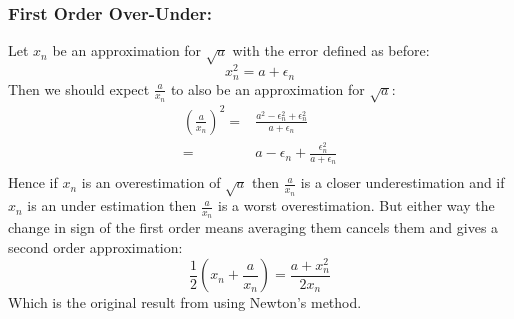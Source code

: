 \subsubsection{First Order Over-Under:}
Let $x_n$ be an approximation for $\sqrt{a}$ with the error defined as before:
\[x_n^2 = a + \epsilon_n\]
Then we should expect $\frac{a}{x_n}$ to also be an approximation for $\sqrt{a}$:
\begin{equation*}
\begin{aligned}
	\left(\frac{a}{x_n}\right)^2 =& \frac{a^2-\epsilon_n^2+\epsilon_n^2}{a+\epsilon_n} \\
	=& a - \epsilon_n + \frac{\epsilon_n^2}{a+\epsilon_n}\\
\end{aligned}
\end{equation*}
Hence if $x_n$ is an overestimation of $\sqrt{a}$ then $\frac{a}{x_n}$ is a closer underestimation and if $x_n$ is an under estimation then $\frac{a}{x_n}$ is a worst overestimation. 
But either way the change in sign of the first order means averaging them cancels them and gives a second order approximation:
\[\frac{1}{2}\left(x_n+\frac{a}{x_n}\right) = \frac{a+x_n^2}{2x_n}\]
Which is the original result from using Newton's method.
